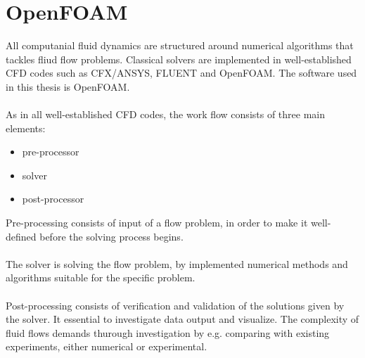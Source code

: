 \documentclass[a4paper, 12pt]{report}
\begin{document}
\chapter{OpenFOAM}
All computanial fluid dynamics are structured around numerical algorithms that tackles fliud flow problems. Classical solvers are implemented in well-established CFD codes such as CFX/ANSYS, FLUENT and OpenFOAM. The software used in this thesis is OpenFOAM.\\
\\   
As in all well-established CFD codes, the work flow consists of three main elements:
\begin{itemize}
\item pre-processor
\item solver
\item post-processor
\end{itemize}
Pre-processing consists of input of a flow problem, in order to make it well-defined before the solving process begins.\\
\\
The solver is solving the flow problem, by implemented numerical methods and algorithms suitable for the specific problem. \\
\\
Post-processing consists of verification and validation of the solutions given by the solver. It essential to investigate data output and visualize. The complexity of fluid flows demands thurough investigation by e.g. comparing with existing experiments, either numerical or experimental.\\
\\
\end{document}
